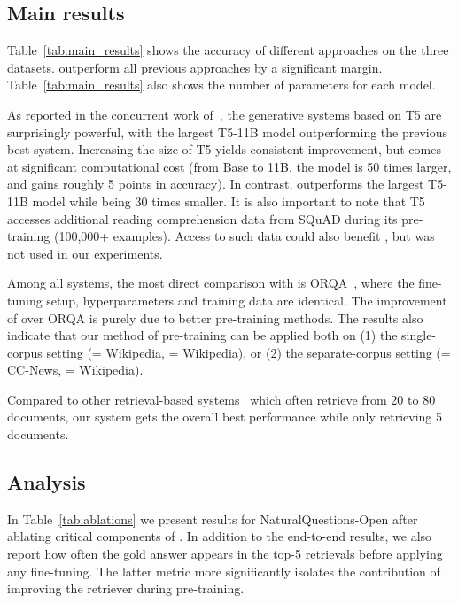 \documentclass{article}
\begin{document}
\subsection{Main results}
Table~\ref{tab:main_results} shows the accuracy of different approaches on the three \openqa datasets. \thename outperform all previous approaches by a significant margin. Table~\ref{tab:main_results} also shows the number of parameters for each model. 

As reported in the concurrent work of~\citet{t5_openqa}, the generative \openqa systems based on T5 are surprisingly powerful, with the largest T5-11B model outperforming the previous best \openqa system.
Increasing the size of T5 yields consistent improvement, but comes at significant computational cost (from Base to 11B, the model is 50 times larger, and gains roughly 5 points in accuracy). In contrast, \thename outperforms the largest T5-11B model while being 30 times smaller. It is also important to note that T5 accesses additional reading comprehension data from SQuAD during its pre-training (100,000+ examples). Access to such data could also benefit \thename, but was not used in our experiments.






Among all systems, the most direct comparison with \thename is ORQA~\cite{orqa}, where the fine-tuning setup, hyperparameters and training data are identical. The improvement of \thename over ORQA is purely due to better pre-training methods. The results also indicate that our method of pre-training can be applied both on (1) the single-corpus setting (\target= Wikipedia, \unlabeled= Wikipedia), or (2) the separate-corpus setting (\target= CC-News, \unlabeled= Wikipedia).

Compared to other retrieval-based systems~\cite{rrp_salesforce,openqa_hardem,GraphRetriever} which often retrieve from 20 to 80 documents, our system gets the overall best performance while only retrieving 5 documents.



\subsection{Analysis}\label{sec:ablation}

In Table~\ref{tab:ablations} we present results for NaturalQuestions-Open after ablating critical components of \thename. In addition to the end-to-end results, we also report how often the gold answer appears in the top-5 retrievals before applying any fine-tuning. The latter metric more significantly isolates the contribution of improving the retriever during pre-training.
\end{document}
